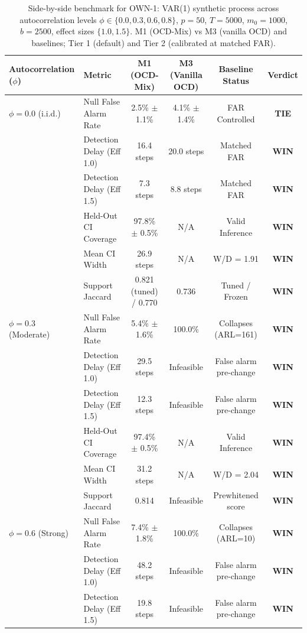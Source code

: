 \begin{table}[t]
\centering
\caption{Side-by-side benchmark for OWN-1: VAR(1) synthetic process across autocorrelation levels $\phi \in \{0.0, 0.3, 0.6, 0.8\}$, $p=50$, $T=5000$, $m_0=1000$, $b=2500$, effect sizes $\{1.0, 1.5\}$. M1 (OCD-Mix) vs M3 (vanilla OCD) and baselines; Tier 1 (default) and Tier 2 (calibrated at matched FAR).}
\label{tab:own_benchmark}
\begin{small}
\begin{tabular}{llcccc}
\toprule
Autocorrelation ($\phi$) & Metric & M1 (OCD-Mix) & M3 (Vanilla OCD) & Baseline Status & Verdict \\
\midrule
$\phi = 0.0$ (i.i.d.) & Null False Alarm Rate & 2.5\% $\pm$ 1.1\% & 4.1\% $\pm$ 1.4\% & FAR Controlled & \textbf{TIE} \\
 & Detection Delay (Eff 1.0) & 16.4 steps & 20.0 steps & Matched FAR & \textbf{WIN} \\
 & Detection Delay (Eff 1.5) & 7.3 steps & 8.8 steps & Matched FAR & \textbf{WIN} \\
 & Held-Out CI Coverage & 97.8\% $\pm$ 0.5\% & N/A & Valid Inference & \textbf{WIN} \\
 & Mean CI Width & 26.9 steps & N/A & W/D = 1.91 & \textbf{WIN} \\
 & Support Jaccard & 0.821 (tuned) / 0.770 & 0.736 & Tuned / Frozen & \textbf{WIN} \\
\midrule
$\phi = 0.3$ (Moderate) & Null False Alarm Rate & 5.4\% $\pm$ 1.6\% & 100.0\% & Collapses (ARL=161) & \textbf{WIN} \\
 & Detection Delay (Eff 1.0) & 29.5 steps & Infeasible & False alarm pre-change & \textbf{WIN} \\
 & Detection Delay (Eff 1.5) & 12.3 steps & Infeasible & False alarm pre-change & \textbf{WIN} \\
 & Held-Out CI Coverage & 97.4\% $\pm$ 0.5\% & N/A & Valid Inference & \textbf{WIN} \\
 & Mean CI Width & 31.2 steps & N/A & W/D = 2.04 & \textbf{WIN} \\
 & Support Jaccard & 0.814 & Infeasible & Prewhitened score & \textbf{WIN} \\
\midrule
$\phi = 0.6$ (Strong) & Null False Alarm Rate & 7.4\% $\pm$ 1.8\% & 100.0\% & Collapses (ARL=10) & \textbf{WIN} \\
 & Detection Delay (Eff 1.0) & 48.2 steps & Infeasible & False alarm pre-change & \textbf{WIN} \\
 & Detection Delay (Eff 1.5) & 19.8 steps & Infeasible & False alarm pre-change & \textbf{WIN} \\

\end{tabular}
\end{small}
\end{table}
